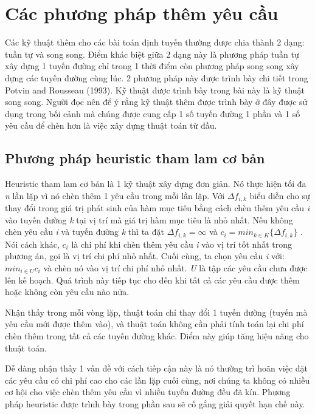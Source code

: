 \section{Các phương pháp thêm yêu cầu}
Các kỹ thuật thêm cho các bài toán định tuyến thường được chia thành 2 dạng: tuần tự và song song. Điểm khác biệt giữa 2 dạng này là phương pháp tuần tự xây dựng 1 tuyến đường chỉ trong 1 thời điểm còn phương pháp song song xây dựng các tuyến đường cùng lúc. 2 phương pháp này được trình bày chi tiết trong Potvin and Rousseau (1993). Kỹ thuật được trình bày trong bài này là kỹ thuật song song. Người đọc nên để ý rằng kỹ thuật thêm được trình bày ở đây được sử dụng trong bối cảnh mà chúng được cung cấp 1 số tuyến đường 1 phần và 1 số yêu cầu để chèn hơn là việc xây dựng thuật toán từ đầu.

\subsection{Phương pháp heuristic tham lam cơ bản}
Heuristic tham lam cơ bản là 1 kỹ thuật xây dựng đơn giản. Nó thực hiện tối đa \textit{n} lần lặp vì nó chèn thêm 1 yêu cầu trong mỗi lần lặp. Với $\Delta f_{i, k}$ biểu diễn cho sự thay đổi trong giá trị phát sinh của hàm mục tiêu bằng cách chèn thêm yêu cầu \textit{i} vào tuyến đường \textit{k} tại vị trí mà giá trị hàm mục tiêu là nhỏ nhất. Nếu không chèn yêu cầu \textit{i} và tuyến đường \textit{k} thì ta đặt $\Delta f_{i, k} = \infty$ và $c_i = min_{k \in K}\{\Delta f_{i, k}\}$ . Nói cách khác, $c_i$ là chi phí khi chèn thêm yêu cầu \textit{i} vào vị trí tốt nhất trong phương án, gọi là vị trí chi phí nhỏ nhất. Cuối cùng, ta chọn yêu cầu \textit{i} với: $min_{i \in U} c_i$ và chèn nó vào vị trí chi phí nhỏ nhất. \textit{U} là tập các yêu cầu chưa được lên kế hoạch. Quá trình này tiếp tục cho đến khi tất cả các yêu cầu được thêm hoặc không còn yêu cầu nào nữa.

Nhận thấy trong mỗi vòng lặp, thuật toán chỉ thay đổi 1 tuyến đường (tuyến mà yêu cầu mới được thêm vào), và thuật toán không cần phải tính toán lại chi phí chèn thêm trong tất cả các tuyến đường khác. Điểm này giúp tăng hiệu năng cho thuật toán.

Dễ dàng nhận thấy 1 vấn đề với cách tiếp cận này là nó thường trì hoãn việc đặt các yêu cầu có chi phí cao cho các lần lặp cuối cùng, nơi chúng ta không có nhiều cơ hội cho việc chèn thêm yêu cầu vì nhiều tuyến đường đều đã kín. Phương pháp heuristic được trình bày trong phần sau sẽ cố gắng giải quyết hạn chế này.

